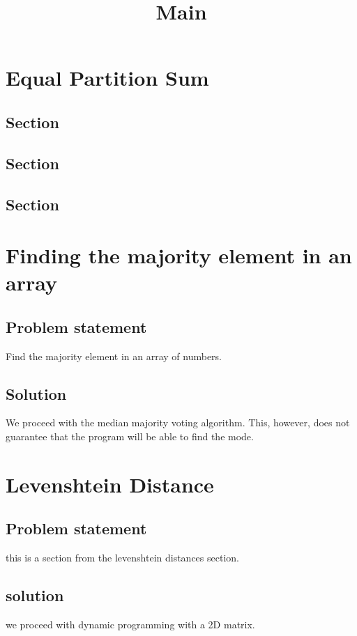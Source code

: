 \documentclass[12pt]{article}
\title{Main}
\begin{document}
\maketitle
\section{Equal Partition Sum}


\subsection{Section}

\subsection{Section}

\subsection{Section}


\section{Finding the majority element in an array}


\subsection{Problem statement}
Find the majority element in an array of numbers.
\subsection{Solution}
We proceed with the median majority voting algorithm. This, however, does not guarantee that
the program will be able to find the mode.

\section{Levenshtein Distance}


\subsection{Problem statement}
this is a section from the levenshtein distances section.
\subsection{solution}
we proceed with dynamic programming with a 2D matrix.
\end{document}
